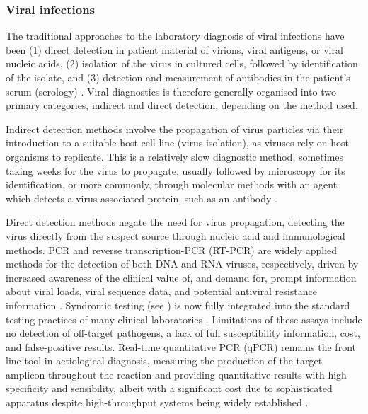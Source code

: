 \subsubsection{Viral infections} \label{sssec:viral}

The traditional approaches to the laboratory diagnosis of viral infections have been (1) direct detection in patient material of virions, viral antigens, or viral nucleic acids, (2) isolation of the virus in cultured cells, followed by identification of the isolate, and (3) detection and measurement of antibodies in the patient’s serum (serology) \citep{burrell_laboratory_2017}. 
Viral diagnostics is therefore generally organised into two primary categories, indirect and direct detection, depending on the method used. 

Indirect detection methods involve the propagation of virus particles via their introduction to a suitable host cell line (virus isolation), as viruses rely on host organisms to replicate. 
This is a relatively slow diagnostic method, sometimes taking weeks for the virus to propagate, usually followed by microscopy for its identification, or more commonly, through molecular methods with an agent which detects a virus-associated protein, such as an antibody \citep{cassedy_virus_2021}. 

Direct detection methods negate the need for virus propagation, detecting the virus directly from the suspect source through nucleic acid and immunological methods. 
PCR and reverse transcription-PCR (RT-PCR) are widely applied methods for the detection of both DNA and RNA viruses, respectively, driven by increased awareness of the clinical value of, and demand for, prompt information about viral loads, viral sequence data, and potential antiviral resistance information \citep{cassedy_virus_2021}. 
Syndromic testing (see ) is now fully integrated into the standard testing practices of many clinical laboratories \citep{dien_bard_panels_2020}. 
Limitations of these assays include no detection of off-target pathogens, a lack of full susceptibility information, cost, and false-positive results. 
Real-time quantitative PCR (qPCR) remains the front line tool in aetiological diagnosis, measuring the production of the target amplicon throughout the reaction and providing quantitative results with high specificity and sensibility, albeit with a significant cost due to sophisticated apparatus despite high-throughput systems being widely established \citep{cassedy_virus_2021}.

